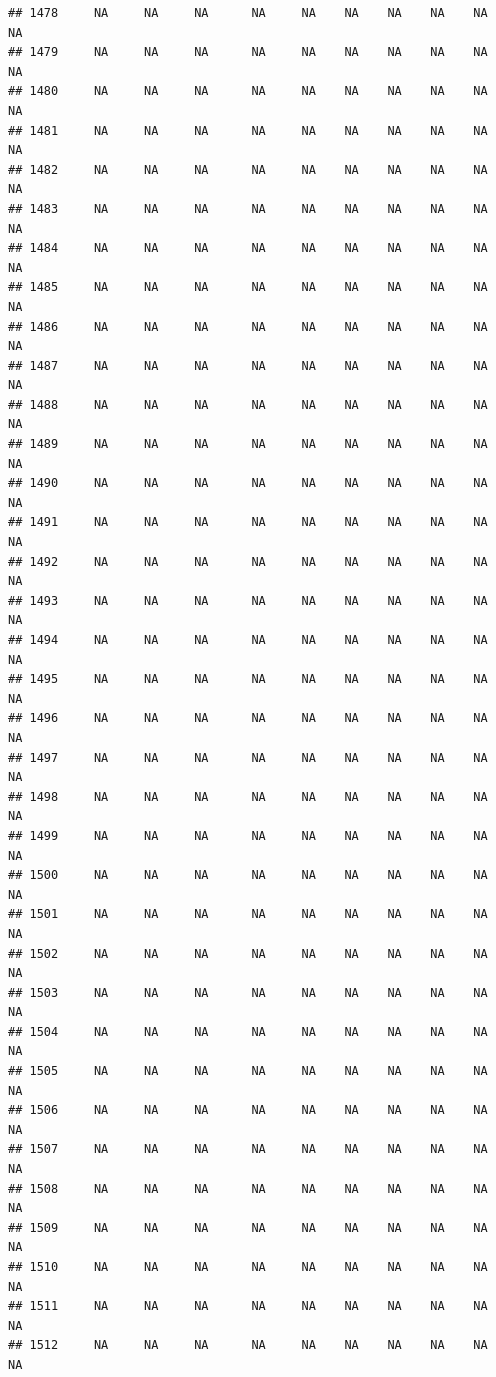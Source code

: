 \documentclass{article}\usepackage{graphicx, color}
\makeatletter
\newenvironment{kframe}{%
 \def\at@end@of@kframe{}%
 \ifinner\ifhmode%
  \def\at@end@of@kframe{\end{minipage}}%
  \begin{minipage}{\columnwidth}%
 \fi\fi%
 \def\FrameCommand##1{\hskip\@totalleftmargin \hskip-\fboxsep
 \colorbox{shadecolor}{##1}\hskip-\fboxsep
     \hskip-\linewidth \hskip-\@totalleftmargin \hskip\columnwidth}%
 \MakeFramed {\advance\hsize-\width
   \@totalleftmargin\z@ \linewidth\hsize
   \@setminipage}}%
 {\par\unskip\endMakeFramed%
 \at@end@of@kframe}
\newenvironment{knitrout}{}{} %
\makeatother
\begin{document}
\begin{knitrout}
\begin{kframe}
\begin{verbatim}
## 1478     NA     NA     NA      NA     NA    NA    NA    NA    NA     NA
## 1479     NA     NA     NA      NA     NA    NA    NA    NA    NA     NA
## 1480     NA     NA     NA      NA     NA    NA    NA    NA    NA     NA
## 1481     NA     NA     NA      NA     NA    NA    NA    NA    NA     NA
## 1482     NA     NA     NA      NA     NA    NA    NA    NA    NA     NA
## 1483     NA     NA     NA      NA     NA    NA    NA    NA    NA     NA
## 1484     NA     NA     NA      NA     NA    NA    NA    NA    NA     NA
## 1485     NA     NA     NA      NA     NA    NA    NA    NA    NA     NA
## 1486     NA     NA     NA      NA     NA    NA    NA    NA    NA     NA
## 1487     NA     NA     NA      NA     NA    NA    NA    NA    NA     NA
## 1488     NA     NA     NA      NA     NA    NA    NA    NA    NA     NA
## 1489     NA     NA     NA      NA     NA    NA    NA    NA    NA     NA
## 1490     NA     NA     NA      NA     NA    NA    NA    NA    NA     NA
## 1491     NA     NA     NA      NA     NA    NA    NA    NA    NA     NA
## 1492     NA     NA     NA      NA     NA    NA    NA    NA    NA     NA
## 1493     NA     NA     NA      NA     NA    NA    NA    NA    NA     NA
## 1494     NA     NA     NA      NA     NA    NA    NA    NA    NA     NA
## 1495     NA     NA     NA      NA     NA    NA    NA    NA    NA     NA
## 1496     NA     NA     NA      NA     NA    NA    NA    NA    NA     NA
## 1497     NA     NA     NA      NA     NA    NA    NA    NA    NA     NA
## 1498     NA     NA     NA      NA     NA    NA    NA    NA    NA     NA
## 1499     NA     NA     NA      NA     NA    NA    NA    NA    NA     NA
## 1500     NA     NA     NA      NA     NA    NA    NA    NA    NA     NA
## 1501     NA     NA     NA      NA     NA    NA    NA    NA    NA     NA
## 1502     NA     NA     NA      NA     NA    NA    NA    NA    NA     NA
## 1503     NA     NA     NA      NA     NA    NA    NA    NA    NA     NA
## 1504     NA     NA     NA      NA     NA    NA    NA    NA    NA     NA
## 1505     NA     NA     NA      NA     NA    NA    NA    NA    NA     NA
## 1506     NA     NA     NA      NA     NA    NA    NA    NA    NA     NA
## 1507     NA     NA     NA      NA     NA    NA    NA    NA    NA     NA
## 1508     NA     NA     NA      NA     NA    NA    NA    NA    NA     NA
## 1509     NA     NA     NA      NA     NA    NA    NA    NA    NA     NA
## 1510     NA     NA     NA      NA     NA    NA    NA    NA    NA     NA
## 1511     NA     NA     NA      NA     NA    NA    NA    NA    NA     NA
## 1512     NA     NA     NA      NA     NA    NA    NA    NA    NA     NA

\end{verbatim}
\end{kframe}
\end{knitrout}
\end{document}
